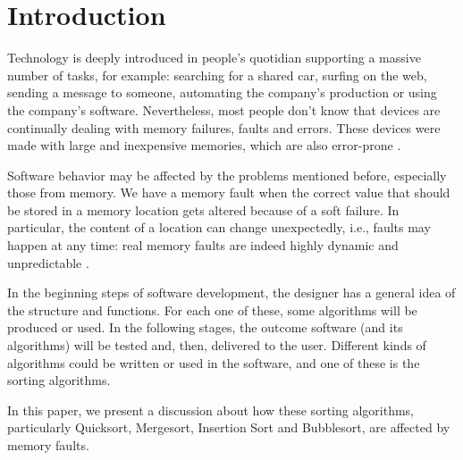 \section{Introduction}
Technology is deeply introduced in people's quotidian supporting a massive number of tasks, for example: searching for a shared car, surfing on the web, sending a message to someone, automating the company's production or using the company's software. Nevertheless, most people don't know that devices are continually dealing with memory failures, faults and errors. These devices were made with large and inexpensive memories, which are also error-prone \cite{Finocchi2004}.

Software behavior may be affected by the problems mentioned before, especially those from memory. We have a memory fault when the correct value that should be stored in a memory location gets altered because of a soft failure. In particular, the content of a location can change unexpectedly, i.e., faults may happen at any time: real memory faults are indeed highly dynamic and unpredictable \cite{Hamdioui2003}.

In the beginning steps of software development, the designer has a general idea of the structure and functions. For each one of these, some algorithms will be produced or used. In the following stages, the outcome software (and its algorithms) will be tested and, then, delivered to the user. Different kinds of algorithms could be written or used in the software, and one of these is the sorting algorithms.

In this paper, we present a discussion about how these sorting algorithms, particularly Quicksort, Mergesort, Insertion Sort and Bubblesort, are affected by memory faults.